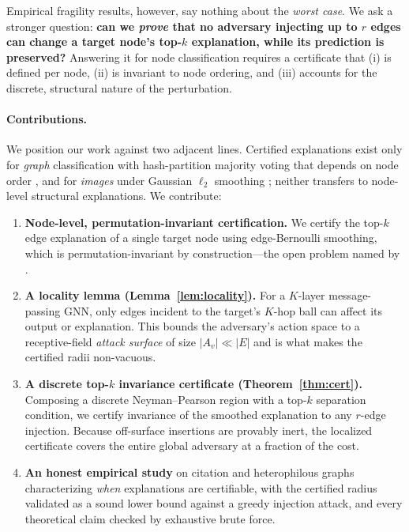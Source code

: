 \documentclass[11pt]{article}
\begin{document}
Empirical fragility results, however, say nothing about the \emph{worst case}. We
ask a stronger question: \textbf{can we \emph{prove} that no adversary injecting
up to $r$ edges can change a target node's top-$k$ explanation, while its
prediction is preserved?} Answering it for node classification requires a
certificate that (i) is defined per node, (ii) is invariant to node ordering, and
(iii) accounts for the discrete, structural nature of the perturbation.

\paragraph{Contributions.} We position our work against two adjacent lines.
Certified explanations exist only for \emph{graph} classification with
hash-partition majority voting that depends on node order
\citep{li2025xgnncert}, and for \emph{images} under Gaussian $\ell_2$ smoothing
\citep{anani2025pixelcert}; neither transfers to node-level structural
explanations. We contribute:
\begin{enumerate}
  \item \textbf{Node-level, permutation-invariant certification.} We certify the
  top-$k$ edge explanation of a single target node using edge-Bernoulli
  smoothing, which is permutation-invariant by construction---the open problem
  named by \citet{li2025xgnncert}.
  \item \textbf{A locality lemma (Lemma~\ref{lem:locality}).} For a $K$-layer
  message-passing GNN, only edges incident to the target's $K$-hop ball can affect
  its output or explanation. This bounds the adversary's action space to a
  receptive-field \emph{attack surface} of size $|A_v| \ll |E|$ and is what makes
  the certified radii non-vacuous.
  \item \textbf{A discrete top-$k$ invariance certificate
  (Theorem~\ref{thm:cert}).} Composing a discrete Neyman--Pearson region with a
  top-$k$ separation condition, we certify invariance of the smoothed explanation
  to any $r$-edge injection. Because off-surface insertions are provably inert,
  the localized certificate covers the entire global adversary at a fraction of
  the cost.
  \item \textbf{An honest empirical study} on citation and heterophilous graphs
  characterizing \emph{when} explanations are certifiable, with the certified
  radius validated as a sound lower bound against a greedy injection attack, and
  every theoretical claim checked by exhaustive brute force.
\end{enumerate}
\end{document}
